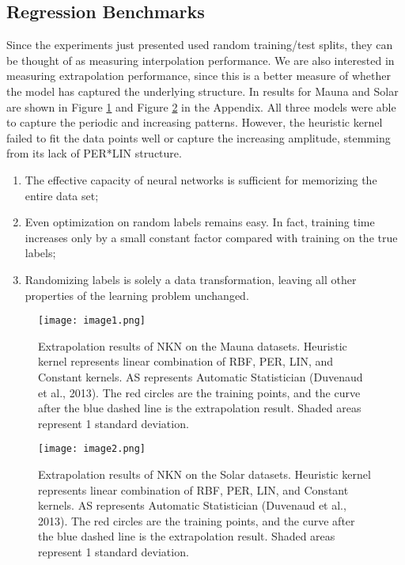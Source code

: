 \documentclass[9pt,a4paper,twoside]{tau}
\begin{document}
    \subsection{Regression Benchmarks}
       Since the experiments just presented used random training/test splits, they can be thought of as measuring interpolation performance. We are also interested in measuring extrapolation performance, since this is a better measure of whether the model has captured the underlying structure. In results for Mauna and Solar are shown in Figure \ref{fig:enter-label} and Figure \ref{fig:enter-labe2} in the Appendix. All three models were able to capture the periodic and increasing patterns. However, the heuristic kernel failed to fit the data points well or capture the increasing amplitude, stemming from its lack of PER*LIN structure. 
       \begin{enumerate}
       \item The effective capacity of neural networks is sufficient for memorizing the entire data set;
       \item Even optimization on random labels remains easy. In fact, training time increases only by a small constant factor compared with training on the true labels; 
       \item Randomizing labels is solely a data transformation, leaving all other properties of the learning problem unchanged.
\end{enumerate}
\begin{figure}[H]
    \centering
    \texttt{[image: image1.png]}
    \caption{Extrapolation results of NKN on the Mauna datasets. Heuristic kernel represents linear combination of RBF, PER, LIN, and Constant kernels. AS represents Automatic Statistician (Duvenaud et al., 2013). The red circles are the training points, and the curve after the blue dashed line is the extrapolation result. Shaded areas represent 1 standard deviation.}
    \label{fig:enter-label}
\end{figure}
\begin{figure}[H]
    \centering
    \texttt{[image: image2.png]}
    \caption{Extrapolation results of NKN on the Solar datasets. Heuristic kernel represents linear combination of RBF, PER, LIN, and Constant kernels. AS represents Automatic Statistician (Duvenaud et al., 2013). The red circles are the training points, and the curve after the blue dashed line is the extrapolation result. Shaded areas represent 1 standard deviation.}
    \label{fig:enter-labe2}
\end{figure}
\end{document}

